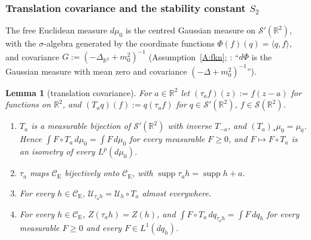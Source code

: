 \documentclass[11pt,a4paper]{article}
\theoremstyle{plain}
\theoremstyle{definition}
\theoremstyle{plain}
\newtheorem{auxlemma}{Lemma}
\theoremstyle{definition}
\newcommand{\R}{\mathbb{R}}
\newcommand{\CE}{\mathcal{C}_{\mathrm E}}
\DeclareMathOperator{\supp}{supp}
\newcommand{\Uc}{\mathcal U}
\newcommand{\dmu}{d\mu_0}
\begin{document}
\subsubsection{Translation covariance and the stability constant $S_2$}\label{sec:notation-S2}

The free Euclidean measure $\dmu$ is the centred Gaussian measure on $\mathcal
S'(\R^2)$, with the $\sigma$-algebra generated by the coordinate functions
$\Phi(f)(q)=\langle q,f\rangle$, and covariance $G:=(-\Delta_{\R^2}+m_0^2)^{-1}$
(Assumption~\ref{A:fkn}; \cite[p.~589]{GJS}: ``$d\Phi$ is the Gaussian measure with mean
zero and covariance $(-\Delta+m_0^2)^{-1}$'').

\begin{auxlemma}[translation covariance]\label{aux:notation-transl}
For $a\in\R^2$ let $(\tau_af)(z):=f(z-a)$ for functions on $\R^2$, and $(T_aq)(f):=q(\tau_af)$
for $q\in\mathcal S'(\R^2)$, $f\in\mathcal S(\R^2)$.
\begin{enumerate}
\item[\textup{(i)}] $T_a$ is a measurable bijection of $\mathcal S'(\R^2)$ with inverse
$T_{-a}$, and $(T_a)_*\mu_0=\mu_0$.  Hence $\int F\circ T_a\,\dmu=\int F\,\dmu$ for every
measurable $F\ge0$, and $F\mapsto F\circ T_a$ is an isometry of every $L^p(\dmu)$.
\item[\textup{(ii)}] $\tau_a$ maps $\CE$ bijectively onto $\CE$, with $\supp\tau_ah=\supp
h+a$.
\item[\textup{(iii)}] For every $h\in\CE$, $\Uc_{\tau_ah}=\Uc_h\circ T_a$ almost everywhere.
\item[\textup{(iv)}] For every $h\in\CE$, $Z(\tau_ah)=Z(h)$, and $\int F\circ T_a\,dq_{\tau_ah}=
\int F\,dq_h$ for every measurable $F\ge0$ and every $F\in L^1(dq_h)$.
\end{enumerate}
\end{auxlemma}
\end{document}
